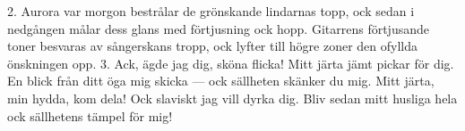 2.  Aurora var morgon bestrålar
    de grönskande lindarnas topp,
    ock sedan i nedgången målar
    dess glans med förtjusning ock hopp.
    Gitarrens förtjusande toner
    besvaras av sångerskans tropp,
    ock lyfter till högre zoner
    den ofyllda önskningen opp.
3.  Ack, ägde jag dig, sköna flicka!
    Mitt järta jämt pickar för dig.
    En blick från ditt öga mig skicka —
    ock sällheten skänker du mig.
    Mitt järta, min hydda, kom dela!
    Ock slaviskt jag vill dyrka dig.
    Bliv sedan mitt husliga hela
    ock sällhetens tämpel för mig!
